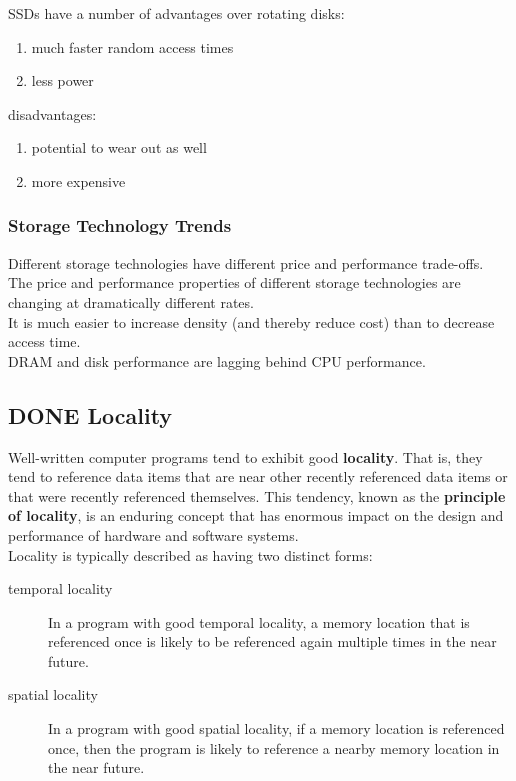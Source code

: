 \documentclass[11pt]{article}
\begin{document}
SSDs have a number of advantages over rotating disks:\\
\begin{enumerate}
\item much faster random access times\\
\item less power\\
\end{enumerate}

disadvantages:\\
\begin{enumerate}
\item potential to wear out as well\\
\item more expensive\\
\end{enumerate}


\subsubsection{Storage Technology Trends}
\label{sec:org438bfe6}
Different storage technologies have different price and performance trade-offs.\\

The price and performance properties of different storage technologies are changing at dramatically different rates.\\

It is much easier to increase density (and thereby reduce cost) than to decrease access time.\\

DRAM and disk performance are lagging behind CPU performance.\\

\subsection{{\bfseries\sffamily DONE} Locality}
\label{sec:orgc4581da}
Well-written computer programs tend to exhibit good \textbf{locality}. That is, they tend to reference data items that are near other recently referenced data items or that were recently referenced themselves. This tendency, known as the \textbf{principle of locality}, is an enduring concept that has enormous impact on the design and performance of hardware and software systems.\\


Locality is typically described as having two distinct forms:\\
\begin{description}
\item[{temporal locality}] In a program with good temporal locality, a memory location that is referenced once is likely to be referenced again multiple times in the near future.\\
\item[{spatial locality}] In a program with good spatial locality, if a memory location is referenced once, then the program is likely to reference a nearby memory location in the near future.\\
\end{description}
\end{document}
